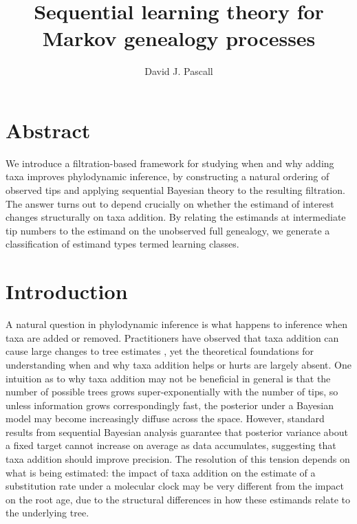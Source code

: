 \documentclass{article}
\title{Sequential learning theory for Markov genealogy processes}
\author[1]{David J. Pascall}
\affil[1]{MRC Biostatistics Unit, University of Cambridge, Cambridge, UK}
\date{}
\begin{document}
\maketitle

\section{Abstract}

We introduce a filtration-based framework for studying when and why adding taxa improves phylodynamic inference, by constructing a natural ordering of observed tips and applying sequential Bayesian theory to the resulting filtration. The answer turns out to depend crucially on whether the estimand of interest changes structurally on taxa addition. By relating the estimands at intermediate tip numbers to the estimand on the unobserved full genealogy, we generate a classification of estimand types termed learning classes.

\section{Introduction}

A natural question in phylodynamic inference is what happens to inference when taxa are added or removed. Practitioners have observed that taxa addition can cause large changes to tree estimates \citep{collienne2025}, yet the theoretical foundations for understanding when and why taxa addition helps or hurts are largely absent. One intuition as to why taxa addition may not be beneficial in general is that the number of possible trees grows super-exponentially with the number of tips, so unless information grows correspondingly fast, the posterior under a Bayesian model may become increasingly diffuse across the space. However, standard results from sequential Bayesian analysis guarantee that posterior variance about a fixed target cannot increase on average as data accumulates, suggesting that taxa addition should improve precision. The resolution of this tension depends on what is being estimated: the impact of taxa addition on the estimate of a substitution rate under a molecular clock may be very different from the impact on the root age, due to the structural differences in how these estimands relate to the underlying tree.
\end{document}
